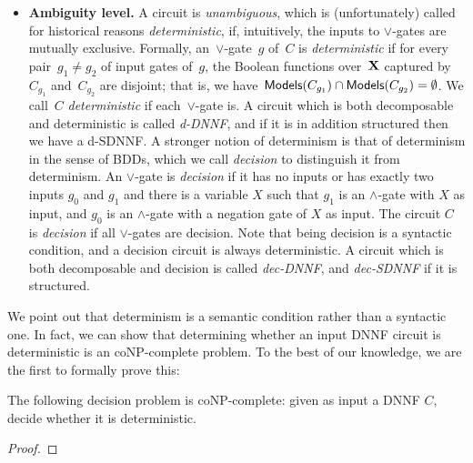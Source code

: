 \begin{itemize}
\item \textbf{Ambiguity level.} A circuit is \emph{unambiguous}, which is (unfortunately) called for historical reasons \emph{deterministic}, if, intuitively, the inputs to $\lor$-gates are mutually exclusive. Formally,
an~$\lor$-gate~$g$ of~$C$ is \emph{deterministic} if
for every pair~$g_1\neq g_2$ of input gates of~$g$, the Boolean functions
over~$\mathbf{X}$ captured by~$C_{g_1}$ and~$C_{g_2}$ are disjoint; that is, we
have~$\mathsf{Models}(C_{g_1}) \cap \mathsf{Models}(C_{g_2}) = \emptyset$.  We call~$C$
\emph{deterministic} if each~$\lor$-gate is. A circuit which is both decomposable and deterministic is called \emph{d-DNNF}, and if it is in addition structured then we have a d-SDNNF. 
A stronger notion of determinism is that of determinism in the sense of BDDs, which we call \emph{decision} to distinguish it from determinism. An $\lor$-gate is \emph{decision} if it has no inputs or has exactly two inputs $g_0$ and $g_1$ and there is a variable $X$ such that $g_1$ is an $\land$-gate with $X$ as input, and $g_0$ is an $\land$-gate with a negation gate of $X$ as input. The circuit $C$ is \emph{decision} if all $\lor$-gates are decision. Note that being decision is a syntactic condition, and a decision circuit is always deterministic. A circuit which is both decomposable and decision is called \emph{dec-DNNF}, and \emph{dec-SDNNF} if it is structured.
\end{itemize}

We point out that determinism is a semantic
condition rather than a syntactic one. In
fact, we can show that determining whether an
input DNNF circuit is deterministic is an
coNP-complete problem. To the best of our knowledge, we are the first to formally prove this:

\begin{proposition}
The following decision problem is
coNP-complete: given as input a DNNF $C$,
decide whether it is deterministic.
\end{proposition}
\begin{proof}
\end{proof}


